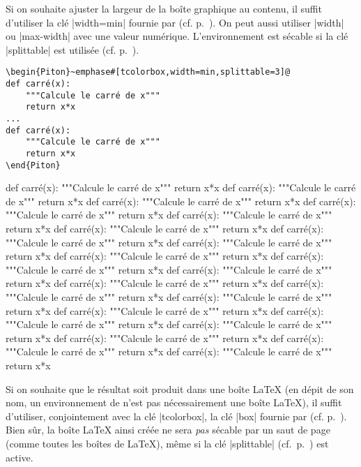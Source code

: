 \documentclass[dvipsnames,svgnames]{article}
\begin{document}
\bigskip
Si on souhaite ajuster la largeur de la boîte graphique au contenu, il suffit
d'utiliser la clé |width=min| fournie par  (cf. p.~\pageref{width}).
On peut aussi utiliser |width| ou |max-width| avec une valeur numérique.
L'environnement est sécable si la clé |splittable| est utilisée
(cf. p.~\pageref{coupure-de-pages}).

\begin{Verbatim}
\begin{Piton}~emphase#[tcolorbox,width=min,splittable=3]@
def carré(x):
    """Calcule le carré de x"""
    return x*x
...
def carré(x):
    """Calcule le carré de x"""
    return x*x
\end{Piton}
\end{Verbatim}

\begin{Piton}[tcolorbox,width=min,splittable=3]
def carré(x):
    """Calcule le carré de x"""
    return x*x
def carré(x):
    """Calcule le carré de x"""
    return x*x
def carré(x):
    """Calcule le carré de x"""
    return x*x
def carré(x):
    """Calcule le carré de x"""
    return x*x
def carré(x):
    """Calcule le carré de x"""
    return x*x
def carré(x):
    """Calcule le carré de x"""
    return x*x
def carré(x):
    """Calcule le carré de x"""
    return x*x
def carré(x):
    """Calcule le carré de x"""
    return x*x
def carré(x):
    """Calcule le carré de x"""
    return x*x
def carré(x):
    """Calcule le carré de x"""
    return x*x
def carré(x):
    """Calcule le carré de x"""
    return x*x
def carré(x):
    """Calcule le carré de x"""
    return x*x
def carré(x):
    """Calcule le carré de x"""
    return x*x
def carré(x):
    """Calcule le carré de x"""
    return x*x
def carré(x):
    """Calcule le carré de x"""
    return x*x
def carré(x):
    """Calcule le carré de x"""
    return x*x
def carré(x):
    """Calcule le carré de x"""
    return x*x
def carré(x):
    """Calcule le carré de x"""
    return x*x
def carré(x):
    """Calcule le carré de x"""
    return x*x  
def carré(x):
    """Calcule le carré de x"""
    return x*x
\end{Piton}



\bigskip
Si on souhaite que le résultat soit produit dans une boîte LaTeX (en dépit de son nom,
un environnement de  n'est pas nécessairement une boîte LaTeX),
il suffit d'utiliser, conjointement avec la clé |tcolorbox|, la clé |box| fournie
par  (cf. p.~\pageref{box}). Bien sûr, la boîte LaTeX ainsi créée ne sera \emph{pas}
sécable par un saut de page (comme toutes les boîtes de LaTeX), même si la clé |splittable|
(cf.~p.~\pageref{splittable}) est active.
\end{document}
